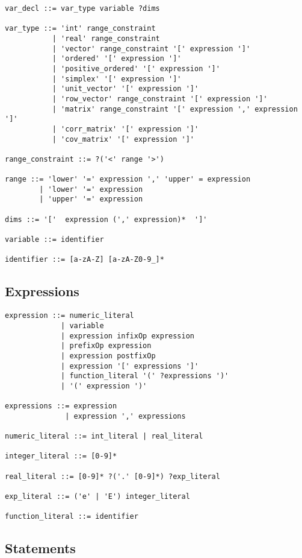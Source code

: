 {
\small
\begin{Verbatim}[fontsize=\small]
var_decl ::= var_type variable ?dims

var_type ::= 'int' range_constraint
           | 'real' range_constraint
           | 'vector' range_constraint '[' expression ']'
           | 'ordered' '[' expression ']'
           | 'positive_ordered' '[' expression ']'
           | 'simplex' '[' expression ']'
           | 'unit_vector' '[' expression ']'
           | 'row_vector' range_constraint '[' expression ']'
           | 'matrix' range_constraint '[' expression ',' expression ']'
           | 'corr_matrix' '[' expression ']'
           | 'cov_matrix' '[' expression ']'

range_constraint ::= ?('<' range '>')

range ::= 'lower' '=' expression ',' 'upper' = expression
        | 'lower' '=' expression
        | 'upper' '=' expression

dims ::= '['  expression (',' expression)*  ']'

variable ::= identifier

identifier ::= [a-zA-Z] [a-zA-Z0-9_]*
\end{Verbatim}
}

\subsection{Expressions}

{
\small
\begin{Verbatim}[fontsize=\small]
expression ::= numeric_literal
             | variable
             | expression infixOp expression
             | prefixOp expression
             | expression postfixOp
             | expression '[' expressions ']'
             | function_literal '(' ?expressions ')'
             | '(' expression ')'

expressions ::= expression
              | expression ',' expressions

numeric_literal ::= int_literal | real_literal

integer_literal ::= [0-9]*

real_literal ::= [0-9]* ?('.' [0-9]*) ?exp_literal
                  
exp_literal ::= ('e' | 'E') integer_literal

function_literal ::= identifier
\end{Verbatim}
}

\subsection{Statements}

